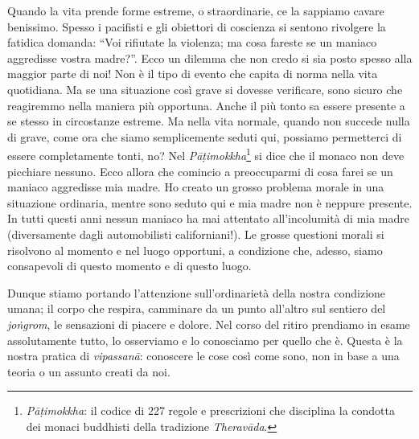 Quando la vita prende forme estreme, o straordinarie, ce la sappiamo
cavare benissimo. Spesso i pacifisti e gli obiettori di coscienza si
sentono rivolgere la fatidica domanda: ``Voi rifiutate la violenza; ma
cosa fareste se un maniaco aggredisse vostra madre?''. Ecco un dilemma
che non credo si sia posto spesso alla maggior parte di noi! Non è il
tipo di evento che capita di norma nella vita quotidiana. Ma se una
situazione così grave si dovesse verificare, sono sicuro che reagiremmo
nella maniera più opportuna. Anche il più tonto sa essere presente a se
stesso in circostanze estreme. Ma nella vita normale, quando non succede
nulla di grave, come ora che siamo semplicemente seduti qui, possiamo
permetterci di essere completamente tonti, no? Nel \textit{Pāṭimokkha}\footnote{\textit{Pāṭimokkha}: il codice di 227 regole e prescrizioni che
disciplina la condotta dei monaci buddhisti della tradizione \textit{Theravāda}.}
si dice che il monaco non deve picchiare nessuno. Ecco allora che
comincio a preoccuparmi di cosa farei se un maniaco aggredisse mia
madre. Ho creato un grosso problema morale in una situazione ordinaria,
mentre sono seduto qui e mia madre non è neppure presente. In tutti
questi anni nessun maniaco ha mai attentato all'incolumità di mia madre
(diversamente dagli automobilisti californiani!). Le grosse questioni
morali si risolvono al momento e nel luogo opportuni, a condizione che,
adesso, siamo consapevoli di questo momento e di questo luogo.

Dunque stiamo portando l'attenzione sull'ordinarietà della nostra
condizione umana; il corpo che respira, camminare da un punto all'altro
sul sentiero del \textit{joṅgrom}, le sensazioni di piacere e dolore. Nel corso
del ritiro prendiamo in esame assolutamente tutto, lo osserviamo e lo
conosciamo per quello che è. Questa è la nostra pratica di \textit{vipassanā}:
conoscere le cose così come sono, non in base a una teoria o un assunto
creati da noi.

